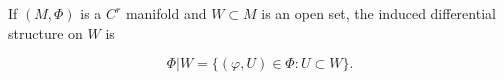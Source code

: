 If $(M, \Phi)$ is a $C^r$ manifold and $W \subset M$ is an open set, the induced differential structure on $W$ is

$$\Phi|W = \{(\varphi, U) \in \Phi : U \subset W\}.$$
